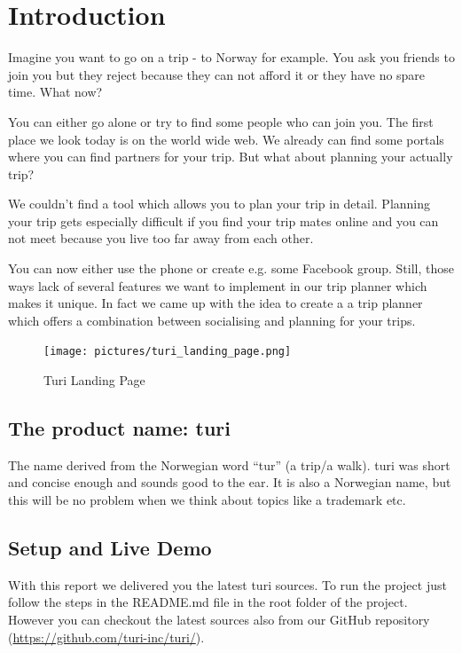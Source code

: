 \documentclass[a4paper]{article}
\begin{document}
\tableofcontents
\pagebreak


\section{Introduction}
Imagine you want to go on a trip - to Norway for example. You ask you friends to join you but they reject because they can not afford it or they have no spare time. What now?

You can either go alone or try to find some people who can join you. The first place we look today is on the world wide web. We already can find some portals where you can find partners for your trip. But what about planning your actually trip?

We couldn’t find a tool which allows you to plan your trip in detail. Planning your trip gets especially difficult if you find your trip mates online and you can not meet because you live too far away from each other. 

You can now either use the phone or create e.g. some Facebook group. Still, those ways lack of several features we want to implement in our trip planner which makes it unique. In fact we came up with the idea to create a a trip planner which offers a combination between socialising and planning for your trips.\\

\begin{figure}[!h]
  \begin{center}
    \texttt{[image: pictures/turi\_landing\_page.png]}
  \end{center}
\caption{Turi Landing Page}
\label{fig:turilandingpage}
\end{figure}

\subsection{The product name: turi}
The name derived from the Norwegian word “tur” (a trip/a walk). turi was short and concise enough and sounds good to the ear. It is also a Norwegian name, but this will be no problem when we think about topics like a trademark etc.

\subsection{Setup and Live Demo}

With this report we delivered you the latest turi sources. To run the project just follow the steps in the README.md file in the root folder of the project. However you can checkout the latest sources also from our GitHub repository (\url{https://github.com/turi-inc/turi/}).\\
\end{document}
